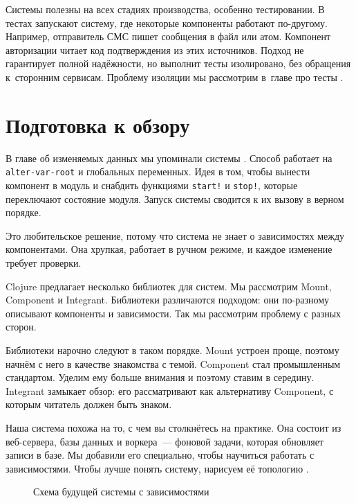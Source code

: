 Системы полезны на всех стадиях производства, особенно тестировании. В тестах
запускают систему, где некоторые компоненты работают по-другому. Например,
отправитель СМС пишет сообщения в файл или атом. Компонент авторизации читает
код подтверждения из этих источников. Подход не гарантирует полной надёжности,
но выполнит тесты изолировано, без обращения к~сторонним сервисам. Проблему
изоляции мы рассмотрим в~главе про тесты .

\section{Подготовка к обзору}


В главе об изменяемых данных мы упоминали системы . Способ
работает на \verb|alter-var-root| и глобальных переменных. Идея в том, чтобы
вынести компонент в модуль и снабдить функциями \verb|start!| и
\verb|stop!|, которые переключают состояние модуля. Запуск системы сводится к
их вызову в верном порядке.

Это любительское решение, потому что система не знает о зависимостях между
компонентами. Она хрупкая, работает в ручном режиме, и каждое изменение требует
проверки.

Clojure предлагает несколько библиотек для систем. Мы рассмотрим Mount,
Component и Integrant. Библиотеки различаются подходом: они по-разному описывают
компоненты и зависимости. Так мы рассмотрим проблему с разных сторон.

Библиотеки нарочно следуют в таком порядке. Mount устроен проще, поэтому начнём
с него в качестве знакомства с темой. Component стал промышленным
стандартом. Уделим ему больше внимания и поэтому ставим в середину. Integrant
замыкает обзор: его рассматривают как альтернативу Component, с которым читатель
должен быть знаком.

Наша система похожа на то, с чем вы столкнётесь на практике. Она состоит из
веб-сервера, базы данных и воркера~--- фоновой задачи, которая обновляет записи
в базе. Мы добавили его специально, чтобы научиться работать с
зависимостями. Чтобы лучше понять систему, нарисуем её топологию .

\begin{figure}[ht!]
  \small
  \caption{Схема будущей системы с зависимостями}
  \label{fig:chart-system}
\end{figure}

